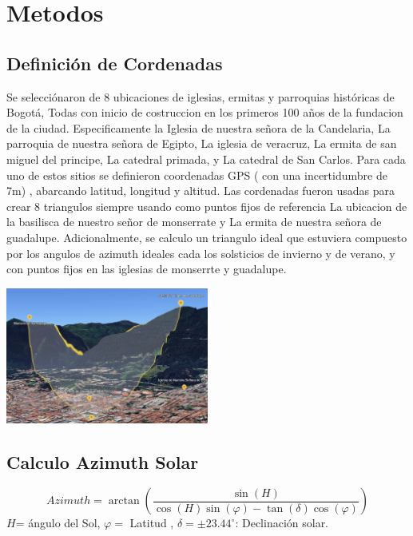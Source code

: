 \documentclass[a4paper,alpha-refs]{eSpectra}
\begin{document}
\section{Metodos}

\subsection{Definición de Cordenadas}
Se selecciónaron de 8 ubicaciones  de iglesias, ermitas y parroquias  históricas de Bogotá, Todas con inicio de costruccion en los primeros 100 años de la fundacion de la ciudad. Especificamente  la Iglesia de nuestra señora de la Candelaria, La parroquia de nuestra señora de Egipto, La iglesia de veracruz, La ermita de san miguel del principe, La catedral primada, y La catedral de San Carlos. 
Para cada uno de estos sitios se definieron coordenadas  GPS ( con una incertidumbre de 7m) , abarcando latitud, longitud y altitud. Las cordenadas fueron usadas para crear 8 triangulos siempre usando como puntos fijos de referencia La ubicacion de la basilisca de nuestro señor de monserrate y La ermita de nuestra señora de guadalupe. Adicionalmente, se calculo un triangulo ideal que estuviera compuesto por los angulos de azimuth ideales cada los solsticios de invierno y de verano, y con puntos fijos en las iglesias de monserrte y guadalupe.
\smallskip

\centering
   \includegraphics[width=0.5\textwidth]{images/Pasted image 20250617164513.png}
\justifying


\subsection{Calculo Azimuth Solar}


\[Azimuth=\arctan \left(
\frac{\sin(H)}{\cos(H)\sin(\varphi) - \tan(\delta)\cos(\varphi)}
\right)\]
\noindent \(H\)= ángulo del Sol, \(\varphi =\) Latitud , \(\delta = \pm 23.44^\circ\): Declinación solar.
\end{document}
